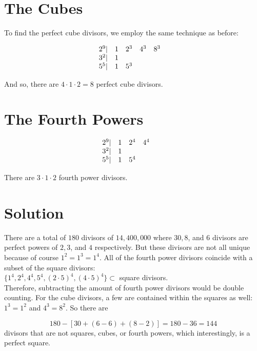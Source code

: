 \documentclass[]{article}
\begin{document}
\section{The Cubes}
To find the perfect cube divisors, we employ the same technique as before:

$$
\begin{array}{cccccc}
2^9 \vert & 1 & 2^3 & 4^3 & 8^3 &  \\ 
3^2 \vert & 1 &  & \space & \space & \space \\ 
5^5 \vert & 1 & 5^3 & &  \space &\space 
\end{array} 
$$

And so, there are $4\cdot 1 \cdot 2 = 8$ perfect cube divisors.

\section{The Fourth Powers}
$$
\begin{array}{cccccc}
2^9 \vert & 1 & 2^4 & 4^4 &  &  \\ 
3^2 \vert & 1 &  & \space & \space & \space \\ 
5^5 \vert & 1 & 5^4 & &  \space &\space 
\end{array} 
$$

There are $3\cdot 1 \cdot 2$ fourth power divisors.
\section{Solution}

There are a total of $180$ divisors of $14,400,000$ where $30, 8$, and $6$ divisors are perfect powers of $2, 3$, and $4$ respectively. But these divisors are not all unique because of course $1^2=1^3=1^4$. All of the fourth power divisors coincide with a subset of the square divisors:\\

$\{1^4, 2^4, 4^4, 5^4, (2\cdot5)^4, (4\cdot5)^4\} \subset$ square divisors.\\

Therefore, subtracting the amount of fourth power divisors would be double counting. For the cube divisors, a few are contained within the squares as well: $1^3 = 1^2$ and $ 4^3 = 8^2$. So there are 

$$180 - [30 + (6-6) + (8-2)] = 180 - 36 = 144$$ divisors that are not squares, cubes, or fourth powers, which interestingly, is a perfect square.
\end{document}
